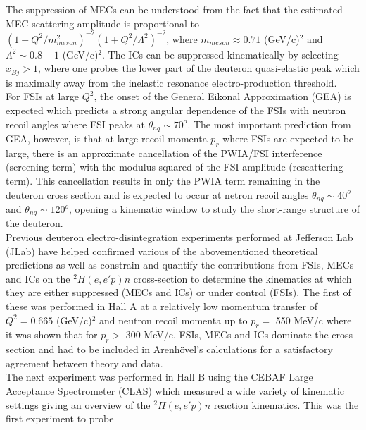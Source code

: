 The suppression of MECs can be understood from the fact that the estimated MEC scattering amplitude is proportional to  $(1 + Q^{2}/m^{2}_{meson})^{-2}(1+Q^{2}/\Lambda^{2})^{-2}$, where $m_{meson}\approx0.71$ (GeV/c)$^{2}$ and
$\Lambda^{2}\sim 0.8-1 $ (GeV/c)$^{2}$\cite{Sargsian_2001}. The ICs can be suppressed kinematically by selecting $x_{Bj}>1$, where one probes the lower part of the deuteron quasi-elastic peak which is maximally away from the inelastic resonance
electro-production threshold. \\
\indent For FSIs at large $Q^{2}$, the onset of the General Eikonal Approximation (GEA)\cite{Sargsian_2001,PhysRevC.56.1124,sargsian_2015} is expected which predicts a strong angular dependence of the FSIs with neutron recoil angles where FSI peaks at $\theta_{nq}\sim70^{o}$. The
most important prediction from GEA, however, is that at large recoil momenta $p_{r}$ where FSIs are expected to be large, there is an approximate cancellation of the PWIA/FSI interference (screening term) with the
modulus-squared of the FSI amplitude (rescattering term). This cancellation results in only the PWIA term remaining in the deuteron cross section and is expected to occur at netron recoil angles $\theta_{nq}\sim40^{o}$ and $\theta_{nq}\sim120^{o}$,
opening a kinematic window to study the short-range structure of the deuteron. \\
\indent Previous deuteron electro-disintegration experiments performed at Jefferson Lab (JLab) have helped confirmed various of the abovementioned theoretical predictions as well as constrain and quantify the contributions from FSIs, MECs and ICs on
the $^{2}H(e,e'p)n$ cross-section to determine the kinematics at which they are either suppressed (MECs and ICs) or under control (FSIs). The first of these was performed in Hall A \cite{PhysRevLett.89.062301}
at a relatively low momentum transfer of $Q^{2}=0.665$ (GeV/c)$^{2}$ and neutron recoil momenta up to $p_{r} = $ 550 MeV/c where it was shown that for $p_{r}>$ 300 MeV/c, FSIs, MECs and ICs dominate the cross section and
had to be included in Arenh\"{o}vel's calculations \cite{PhysRevC.43.1022, PhysRevC.46.455, PhysRevC.52.1232, PhysRevC.55.2214} for a satisfactory agreement between theory and data. \\
\indent The next experiment was performed in Hall B \cite{PhysRevLett.98.262502} using the CEBAF Large Acceptance Spectrometer (CLAS) which measured a wide variety of kinematic settings
giving an overview of the $^{2}H(e,e'p)n$ reaction kinematics. This was the first experiment to probe
